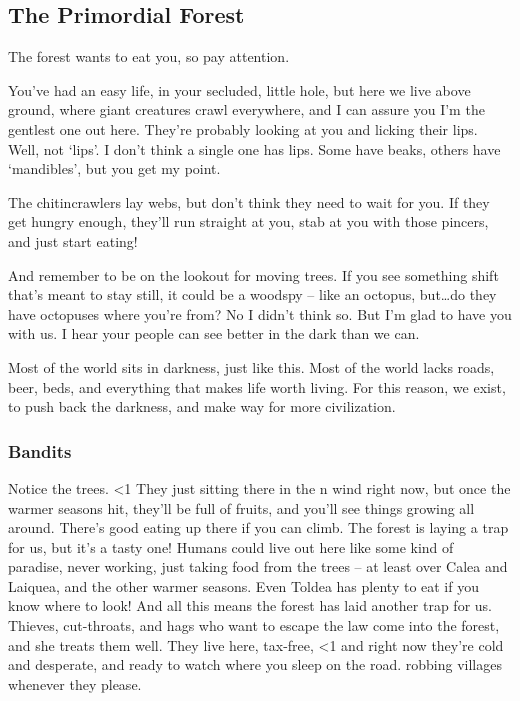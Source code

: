 \begin{multicols}{2}

\subsection*{The Primordial Forest}

\begin{exampletext}

  \noindent
  The forest wants to eat you, so pay attention.

  You've had an easy life, in your secluded, little hole, but here we live above ground, where giant creatures crawl everywhere, and I can assure you I'm the gentlest one out here.
  They're probably looking at you and licking their lips.
Well, not `lips'.
  I don't think a single one has lips.
  Some have beaks, others have `mandibles', but you get my point.

  The chitincrawlers lay webs, but don't think they need to wait for you.
  If they get hungry enough, they'll run straight at you, stab at you with those pincers, and just start eating!

  And remember to be on the lookout for moving trees.
  If you see something shift that's meant to stay still, it could be a woodspy -- like an octopus, but\ldots do they have octopuses where you're from?
  No I didn't think so.
  But I'm glad to have you with us.
  I hear your people can see better in the dark than we can.

  Most of the world sits in darkness, just like this.
  Most of the world lacks roads, beer, beds, and everything that makes life worth living.
  For this reason, we exist, to push back the darkness, and make way for more civilization.

  \subsubsection*{Bandits}

  Notice the trees.
  \ifnum\value{temperature}<1
    They just sitting there in the \showSeason n wind right now, but once the warmer seasons hit, they'll be full of fruits, and you'll see things growing all around.
  \else
    There's good eating up there if you can climb.
    The forest is laying a trap for us, but it's a tasty one!
  \fi
  Humans could live out here like some kind of paradise, never working, just taking food from the trees -- at least over \gls{Calea} and \gls{Laiquea}, and the other warmer seasons.
  Even \gls{Toldea} has plenty to eat if you know where to look!
  And all this means the forest has laid another trap for us.
  Thieves, cut-throats, and hags who want to escape the law come into the forest, and she treats them well.
  They live here, tax-free,
  \ifnum\value{temperature}<1
    and right now they're cold and desperate, and ready to watch where you sleep on the road.
  \else
    robbing \glspl{village} whenever they please.
  \fi


\end{exampletext}
\end{multicols}
